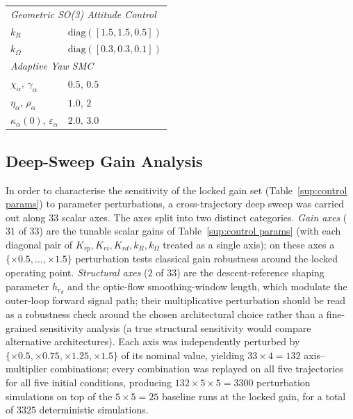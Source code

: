 \documentclass[10pt,journal]{IEEEtran}
\begin{document}
\begin{table}[!t]
\begin{tabular}{ll}
        \multicolumn{2}{l}{\textit{Geometric SO(3) Attitude Control}} \\
        $k_R$      & $\text{diag}([1.5,1.5,0.5])$ \\
        $k_\Omega$ & $\text{diag}([0.3,0.3,0.1])$ \\
    \midrule
        \multicolumn{2}{l}{\textit{Adaptive Yaw SMC}} \\
        $\chi_\alpha,\,\gamma_\alpha$       & $0.5,\,0.5$ \\
        $\eta_\alpha,\,\rho_\alpha$         & $1.0,\,2$ \\
        $\kappa_{\alpha}(0),\,\varepsilon_\alpha$ & $2.0,\,3.0$ \\
    \bottomrule
    \end{tabular}
\end{table}

\clearpage
\subsection{Deep-Sweep Gain Analysis}
\label{sec:sup-sweep}

In order to characterise the sensitivity of the locked gain set (Table~\ref{sup:control params}) to parameter perturbations, a cross-trajectory deep sweep was carried out along $33$ scalar axes. The axes split into two distinct categories. \emph{Gain axes} ($31$ of $33$) are the tunable scalar gains of Table~\ref{sup:control params} (with each diagonal pair of $K_{rp},K_{ri},K_{rd},k_R,k_\Omega$ treated as a single axis); on these axes a $\{\times 0.5,\ldots,\times 1.5\}$ perturbation tests classical gain robustness around the locked operating point. \emph{Structural axes} ($2$ of $33$) are the descent-reference shaping parameter $h_{r_d}$ and the optic-flow smoothing-window length, which modulate the outer-loop forward signal path; their multiplicative perturbation should be read as a robustness check around the chosen architectural choice rather than a fine-grained sensitivity analysis (a true structural sensitivity would compare alternative architectures). Each axis was independently perturbed by $\{\times 0.5,\times 0.75,\times 1.25,\times 1.5\}$ of its nominal value, yielding $33\times 4 = 132$ axis--multiplier combinations; every combination was replayed on all five trajectories for all five initial conditions, producing $132\times 5\times 5 = 3300$ perturbation simulations on top of the $5\times 5 = 25$ baseline runs at the locked gain, for a total of $3325$ deterministic simulations.
\end{document}
